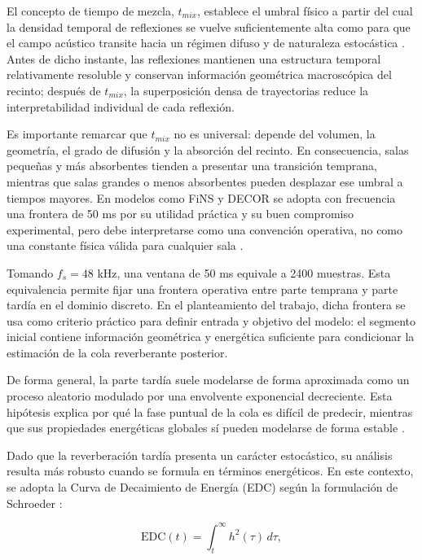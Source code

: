 El concepto de tiempo de mezcla, $t_{mix}$, establece el umbral físico a partir del cual la densidad temporal de reflexiones se vuelve suficientemente alta como para que el campo acústico transite hacia un régimen difuso y de naturaleza estocástica \cite{Kuttruff2016}. Antes de dicho instante, las reflexiones mantienen una estructura temporal relativamente resoluble y conservan información geométrica macroscópica del recinto; después de $t_{mix}$, la superposición densa de trayectorias reduce la interpretabilidad individual de cada reflexión.

Es importante remarcar que $t_{mix}$ no es universal: depende del volumen, la geometría, el grado de difusión y la absorción del recinto. En consecuencia, salas pequeñas y más absorbentes tienden a presentar una transición temprana, mientras que salas grandes o menos absorbentes pueden desplazar ese umbral a tiempos mayores. En modelos como FiNS y DECOR se adopta con frecuencia una frontera de 50 ms por su utilidad práctica y su buen compromiso experimental, pero debe interpretarse como una convención operativa, no como una constante física válida para cualquier sala \cite{DEFRANCE2010777}.

Tomando $f_s=48$ kHz, una ventana de 50 ms equivale a 2400 muestras. Esta equivalencia permite fijar una frontera operativa entre parte temprana y parte tardía en el dominio discreto. En el planteamiento del trabajo, dicha frontera se usa como criterio práctico para definir entrada y objetivo del modelo: el segmento inicial contiene información geométrica y energética suficiente para condicionar la estimación de la cola reverberante posterior.

De forma general, la parte tardía suele modelarse de forma aproximada como un proceso aleatorio modulado por una envolvente exponencial decreciente. Esta hipótesis explica por qué la fase puntual de la cola es difícil de predecir, mientras que sus propiedades energéticas globales sí pueden modelarse de forma estable \cite{DEFRANCE2010777}.

Dado que la reverberación tardía presenta un carácter estocástico, su análisis resulta más robusto cuando se formula en términos energéticos. En este contexto, se adopta la Curva de Decaimiento de Energía (EDC) según la formulación de Schroeder \cite{Schroeder1965}:

\begin{equation}
\mathrm{EDC}(t) = \int_t^\infty h^2(\tau) \, d\tau,
\end{equation}

